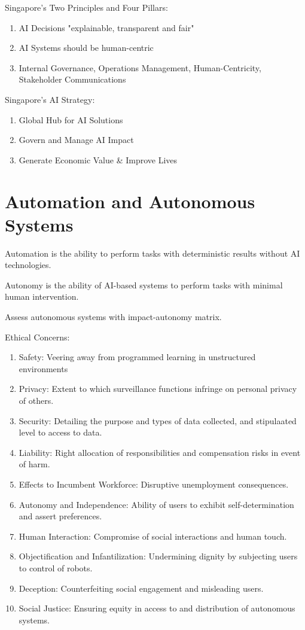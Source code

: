 \documentclass[12pt, a4paper]{article}
\begin{document}
\begin{multicols*}{3}
Singapore's Two Principles and Four Pillars:
\begin{enumerate}[\roman*.]
  \item AI Decisions "explainable, transparent and fair"
  \item AI Systems should be human-centric
  \item Internal Governance, Operations Management, Human-Centricity, Stakeholder Communications
\end{enumerate}

Singapore's AI Strategy:
\begin{enumerate}[\roman*.]
  \item Global Hub for AI Solutions
  \item Govern and Manage AI Impact
  \item Generate Economic Value \& Improve Lives
\end{enumerate}

\section{Automation and Autonomous Systems}
Automation is the ability to perform tasks with deterministic results without AI technologies.

Autonomy is the ability of AI-based systems to perform tasks with minimal human intervention.

Assess autonomous systems with impact-autonomy matrix.

Ethical Concerns:
\begin{enumerate}[\roman*.]
  \item Safety: Veering away from programmed learning in unstructured environments
  \item Privacy: Extent to which surveillance functions infringe on personal privacy of others.
  \item Security: Detailing the purpose and types of data collected, and stipulaated level to access to data.
  \item Liability: Right allocation of responsibilities and compensation risks in event of harm.
  \item Effects to Incumbent Workforce: Disruptive unemployment consequences.
  \item Autonomy and Independence: Ability of users to exhibit self-determination and assert preferences.
  \item Human Interaction: Compromise of social interactions and human touch.
  \item Objectification and Infantilization: Undermining dignity by subjecting users to control of robots.
  \item Deception: Counterfeiting social engagement and misleading users.
  \item Social Justice: Ensuring equity in access to and distribution of autonomous systems.
\end{enumerate}


\end{multicols*}
\end{document}
